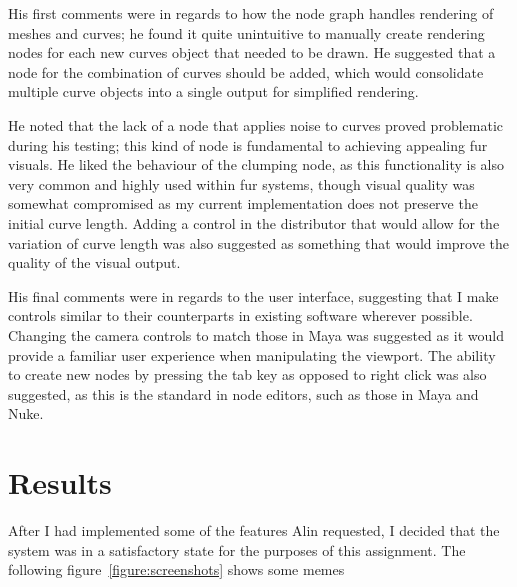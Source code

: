 \documentclass[]{acmsiggraph}
\begin{document}
His first comments were in regards to how the node graph handles rendering of meshes and curves; he found it quite unintuitive to manually create rendering nodes for each new curves object that needed to be drawn. He suggested that a node for the combination of curves should be added, which would consolidate multiple curve objects into a single output for simplified rendering.

He noted that the lack of a node that applies noise to curves proved problematic during his testing; this kind of node is fundamental to achieving appealing fur visuals. He liked the behaviour of the clumping node, as this functionality is also very common and highly used within fur systems, though visual quality was somewhat compromised as my current implementation does not preserve the initial curve length. Adding a control in the distributor that would allow for the variation of curve length was also suggested as something that would improve the quality of the visual output.

His final comments were in regards to the user interface, suggesting that I make controls similar to their counterparts in existing software wherever possible. Changing the camera controls to match those in Maya was suggested as it would provide a familiar user experience when manipulating the viewport. The ability to create new nodes by pressing the tab key as opposed to right click was also suggested, as this is the standard in node editors, such as those in Maya and Nuke.

\section{Results} \label{sec:results}

After I had implemented some of the features Alin requested, I decided that the system was in a satisfactory state for the purposes of this assignment. The following figure~\ref{figure:screenshots} shows some memes
\end{document}
